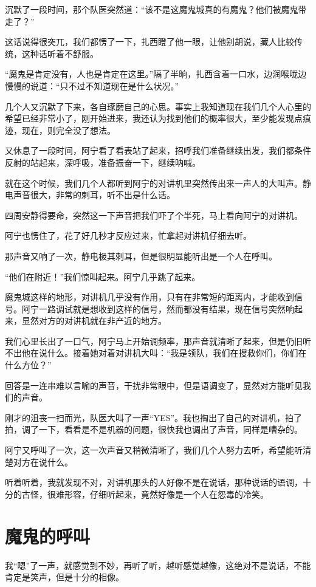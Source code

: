 沉默了一段时间，那个队医突然道：“该不是这魔鬼城真的有魔鬼？他们被魔鬼带走了？”

这话说得很突兀，我们都愣了一下，扎西瞪了他一眼，让他别胡说，藏人比较传统，这种话听着不舒服。

“魔鬼是肯定没有，人也是肯定在这里。”隔了半晌，扎西含着一口水，边润喉咙边慢慢的说道：“只不过不知道现在是什么状况。”

几个人又沉默了下来，各自琢磨自己的心思。事实上我知道现在我们几个人心里的希望已经非常小了，刚开始进来，我还认为找到他们的概率很大，至少能发现点痕迹，现在，则完全没了想法。

又休息了一段时间，阿宁看了看表站了起来，招呼我们准备继续出发，我们都条件反射的站起来，深呼吸，准备振奋一下，继续呐喊。

就在这个时候，我们几个人都听到阿宁的对讲机里突然传出来一声人的大叫声。静电声音很大，非常的刺耳，听不出是什么话。

四周安静得要命，突然这一下声音把我们吓了个半死，马上看向阿宁的对讲机。

阿宁也愣住了，花了好几秒才反应过来，忙拿起对讲机仔细去听。

那声音又响了一次，静电极其刺耳，但是很明显能听出是一个人在呼叫。

“他们在附近！”我们惊叫起来。阿宁几乎跳了起来。

魔鬼城这样的地形，对讲机几乎没有作用，只有在非常短的距离内，才能收到信号。阿宁一路调试就是想收到这样的信号，然而都没有结果，现在信号突然响起来，显然对方的对讲机就在非产近的地方。

我们心里长出了一口气，阿宁马上开始调频率，那声音就清晰了起来，但是仍旧听不出他在说什么。接着她对着对讲机大叫：“我是领队，我们在搜救你们，你们在什么方位？”

回答是一连串难以言喻的声音，干扰非常眼中，但是语调变了，显然对方能听见我们的声音。

刚才的沮丧一扫而光，队医大叫了一声“YES”。我也掏出了自己的对讲机，拍了拍，调了一下，看看是不是机器的问题，很快我也调出了声音，同样是嘈杂的。

阿宁又呼叫了一次，这一次声音又稍微清晰了，我们几个人努力去听，希望能听清楚对方在说什么。

听着听着，我就发现不对，对讲机那头的人好像不是在说话，那种说话的语调，十分的古怪，很难形容，仔细听起来，竟然好像是一个人在怨毒的冷笑。

\chapter{魔鬼的呼叫}

我“嗯”了一声，就感觉到不妙，再听了听，越听感觉越像，这绝对不是说话，不能肯定是笑声，但是十分的相像。

